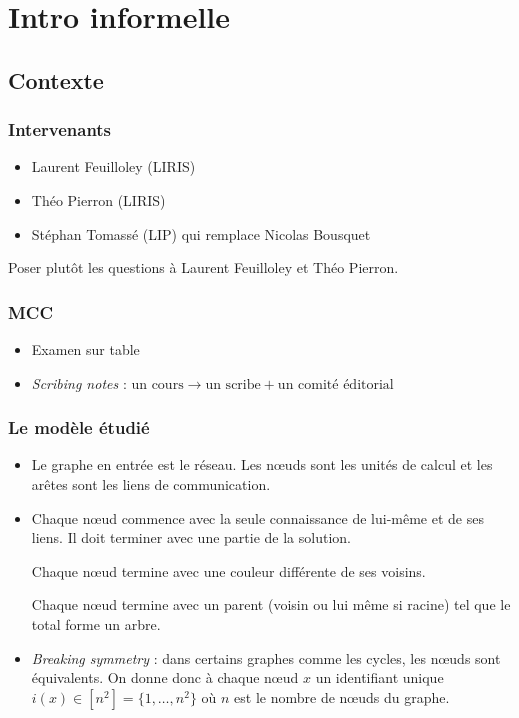 
\section{Intro informelle}

\subsection{Contexte}

\subsubsection{Intervenants}

\begin{itemize}
	\item Laurent Feuilloley (LIRIS)
	\item Théo Pierron (LIRIS)
	\item Stéphan Tomassé (LIP) qui remplace Nicolas Bousquet
\end{itemize}

Poser plutôt les questions à Laurent Feuilloley et Théo Pierron.

\subsubsection{MCC}

\begin{itemize}
	\item Examen sur table
	\item \emph{Scribing notes} : $\text{un cours} \to \text{un scribe} + \text{un comité éditorial}$
\end{itemize}

\subsubsection{Le modèle étudié}

\begin{itemize}
	\item Le graphe en entrée est le réseau. Les nœuds sont les unités de calcul et les arêtes sont les liens de communication.
	\item Chaque nœud commence avec la seule connaissance de lui-même et de ses liens. Il doit terminer avec une partie de la solution.
	
	\begin{exemple}[Coloration]
		Chaque nœud termine avec une couleur différente de ses voisins.
	\end{exemple}
	
	\begin{exemple}
		Chaque nœud termine avec un parent (voisin ou lui même si racine) tel que le total forme un arbre.
	\end{exemple}
	\item \emph{Breaking symmetry} : dans certains graphes comme les cycles, les nœuds sont équivalents. On donne donc à chaque nœud $x$ un identifiant unique $i(x) \in [n^2] = \{ 1, \dots, n^2 \}$ où $n$ est le nombre de nœuds du graphe.
\end{itemize}

